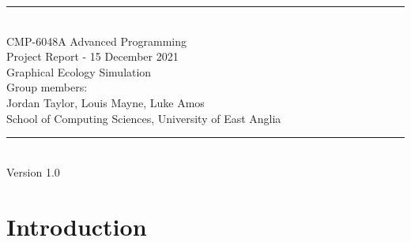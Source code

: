 \documentclass[a4paper, oneside, 11pt]{report}
\begin{document}
\begin{titlepage}
\begin{center}
\rule{12cm}{1mm} \\
\vspace{1cm}
{\large  CMP-6048A Advanced Programming}
\vspace{7.5cm}
\\{\Large Project Report - 15 December 2021}
\vspace{1.5cm}
\\{\LARGE Graphical Ecology Simulation}
\vspace{1.0cm}
\\{\Large Group members: \\ Jordan Taylor, Louis Mayne, Luke Amos}
\vspace{10.0cm}
\\{\large School of Computing Sciences, University of East Anglia}
\\ \rule{12cm}{0.5mm}
\\ \hspace{8.5cm} {\large Version 1.0}
\end{center}
\end{titlepage}


\setcounter{page}{1}


\begin{abstract}
In Our Graphical Ecology Simulation we planned to implement a finite state machine design pattern to be used on each agent. This state machine would hold the current state and execute that state's behaviour. The states we planned to implement were "Idle", "Feed", "Hunt", "Flee", and "Reproduce". A basic implementation of these states would make up our Minimum Viable Product. We also planned to add a genetics system, to modify the attributes of the state machine to make different agents better or worse at completing their goals. We completed the basic implementations of the listed states but did not get any further. The final product is an ecology simulation where agents make random decisions to try to achieve their goals, we found that because the agents were not making "smart" decisions their fate as a group (the prey or predators) was determined by their ability to detect their targets. 
\end{abstract}

\chapter{Introduction}
\label{chap:intro}
\end{document}
